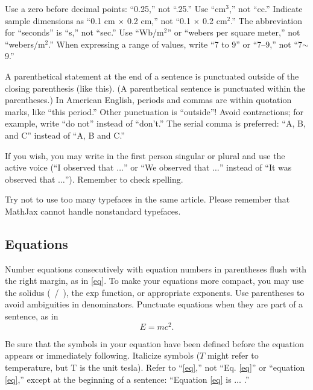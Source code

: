 \documentclass[journal,onecolumn,web]{ieeecolor}
\begin{document}
Use a zero before decimal points: ``0.25,'' not ``.25.'' Use 
``cm$^{3}$,'' not ``cc.'' Indicate sample dimensions as ``0.1 cm 
$\times $ 0.2 cm,'' not ``0.1 $\times $ 0.2 cm$^{2}$.'' The 
abbreviation for ``seconds'' is ``s,'' not ``sec.'' Use 
``Wb/m$^{2}$'' or ``webers per square meter,'' not 
``webers/m$^{2}$.'' When expressing a range of values, write ``7 to 
9'' or ``7--9,'' not ``7$\sim $9.''

A parenthetical statement at the end of a sentence is punctuated outside of 
the closing parenthesis (like this). (A parenthetical sentence is punctuated 
within the parentheses.) In American English, periods and commas are within 
quotation marks, like ``this period.'' Other punctuation is ``outside''! 
Avoid contractions; for example, write ``do not'' instead of ``don't.'' The 
serial comma is preferred: ``A, B, and C'' instead of ``A, B and C.''

If you wish, you may write in the first person singular or plural and use 
the active voice (``I observed that $\ldots$'' or ``We observed that $\ldots$'' 
instead of ``It was observed that $\ldots$''). Remember to check spelling. 


Try not to use too many typefaces in the same article. Please remember that MathJax
cannot handle nonstandard typefaces.

\subsection{Equations}
Number equations consecutively with equation numbers in parentheses flush 
with the right margin, as in \eqref{eq}. To make your equations more 
compact, you may use the solidus (~/~), the exp function, or appropriate 
exponents. Use parentheses to avoid ambiguities in denominators. Punctuate 
equations when they are part of a sentence, as in
\begin{equation}E=mc^2.\label{eq}\end{equation}

Be sure that the symbols in your equation have been defined before the 
equation appears or immediately following. Italicize symbols ($T$ might refer 
to temperature, but T is the unit tesla). Refer to ``\eqref{eq},'' not ``Eq. \eqref{eq}'' 
or ``equation \eqref{eq},'' except at the beginning of a sentence: ``Equation \eqref{eq} 
is $\ldots$ .''
\end{document}
